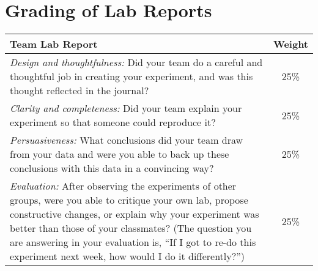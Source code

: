 \section*{Grading of Lab Reports}
%
\begin{tabular}{|p{13cm}|c|}
\hline
\textbf{Team Lab Report} & \textbf{Weight} \\
\hline
\emph{Design and thoughtfulness:} Did your team do a careful and thoughtful job in creating your experiment, and was this thought reflected in the journal? & 25\% \\
\hline
\emph{Clarity and completeness:} Did your team explain your experiment so that someone could reproduce it? & 25\% \\
\hline
\emph{Persuasiveness:} What conclusions did your team draw from your data and were you able to back up these conclusions with this data in a convincing way? & 25\% \\
\hline
\emph{Evaluation:} After observing the experiments of other groups, were you able to critique your own lab, propose constructive changes, or explain why your experiment was better than those of your classmates?  (The question you are answering in your evaluation is, ``If I got to re-do this experiment next week, how would I do it differently?'') & 25\% \\
\hline
\end{tabular}

\newpage

